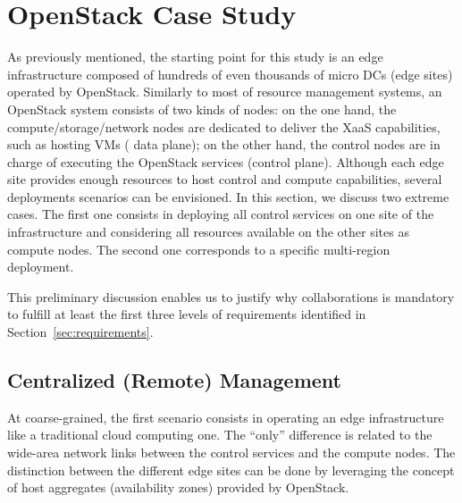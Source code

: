 

\section{OpenStack Case Study}
\label{sec:system_design_considerations}
As previously mentioned, the starting point for this study is an edge
infrastructure composed of hundreds of even thousands of micro DCs (\aka edge sites) operated by OpenStack.
%
Similarly to most of resource management systems, an OpenStack system consists of two kinds
of nodes: on the one hand, the compute/storage/network nodes are
dedicated to deliver the XaaS capabilities, such as hosting VMs (\ie
data plane); on the other hand, the control nodes are in charge of
executing the OpenStack services (\ie control plane).
%
Although each edge site provides enough resources to host control and
compute capabilities, several deployments scenarios can be
envisioned.
%
In this section, we discuss two extreme cases. The first one
consists in deploying all control services on one site of the
infrastructure and considering all resources available on the other sites as compute
nodes.  The second one corresponds to a specific multi-region deployment.
%

This preliminary discussion enables us to justify why collaborations is mandatory to
fulfill at least the first three levels of requirements identified in Section~\ref{sec:requirements}.
%

\subsection{Centralized (Remote) Management}
\label{subsec:centralized_os}
At coarse-grained, the first scenario consists in operating an edge
infrastructure like a traditional cloud computing one.  The ``only''
difference is related to the wide-area network links between the
control services and the compute nodes.  The distinction between the
different edge sites can be done by leveraging the concept of host
aggregates (\aka availability zones) provided by OpenStack.

